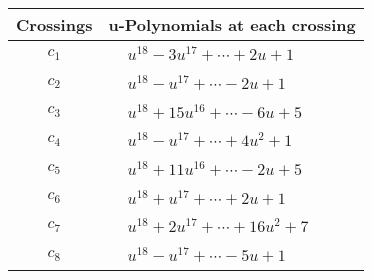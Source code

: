 \documentclass[1p]{elsarticle_modified}
\theoremstyle{definition}
\begin{document}
\begin{tabular}{m{50pt}|m{274pt}}
Crossings & \hspace{64pt}u-Polynomials at each crossing \\
\hline $$\begin{aligned}c_{1}\end{aligned}$$&$\begin{aligned}
&u^{18}-3 u^{17}+\cdots+2 u+1
\end{aligned}$\\
\hline $$\begin{aligned}c_{2}\end{aligned}$$&$\begin{aligned}
&u^{18}- u^{17}+\cdots-2 u+1
\end{aligned}$\\
\hline $$\begin{aligned}c_{3}\end{aligned}$$&$\begin{aligned}
&u^{18}+15 u^{16}+\cdots-6 u+5
\end{aligned}$\\
\hline $$\begin{aligned}c_{4}\end{aligned}$$&$\begin{aligned}
&u^{18}- u^{17}+\cdots+4 u^2+1
\end{aligned}$\\
\hline $$\begin{aligned}c_{5}\end{aligned}$$&$\begin{aligned}
&u^{18}+11 u^{16}+\cdots-2 u+5
\end{aligned}$\\
\hline $$\begin{aligned}c_{6}\end{aligned}$$&$\begin{aligned}
&u^{18}+u^{17}+\cdots+2 u+1
\end{aligned}$\\
\hline $$\begin{aligned}c_{7}\end{aligned}$$&$\begin{aligned}
&u^{18}+2 u^{17}+\cdots+16 u^2+7
\end{aligned}$\\
\hline $$\begin{aligned}c_{8}\end{aligned}$$&$\begin{aligned}
&u^{18}- u^{17}+\cdots-5 u+1
\end{aligned}$\\

\end{tabular}
\end{document}
